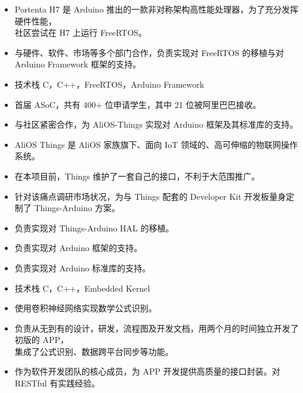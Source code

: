 \documentclass{resume}
\begin{document}
\begin{itemize}
  \item Portenta H7 是 Arduino 推出的一款非对称架构高性能处理器，为了充分发挥硬件性能，\\社区尝试在 H7 上运行 FreeRTOS。
  \item 与硬件、软件、市场等多个部门合作，负责实现对 FreeRTOS 的移植与对 Arduino Framework 框架的支持。
  \item 技术栈 C，C++，FreeRTOS，Arduino Framework
\end{itemize}

\continue

\clearpage

\begin{itemize}
  \item 首届 ASoC，共有 400+ 位申请学生，其中 21 位被阿里巴巴接收。
  \item 与社区紧密合作，为 AliOS-Things 实现对 Arduino 框架及其标准库的支持。
  \item AliOS Things 是 AliOS 家族旗下、面向 IoT 领域的、高可伸缩的物联网操作系统。
  \item 在本项目前，Things 维护了一套自己的接口，不利于大范围推广。
  \item 针对该痛点调研市场状况，为与 Things 配套的 Developer Kit 开发板量身定制了 Things-Arduino 方案。
  \item 负责实现对 Things-Arduino HAL 的移植。
  \item 负责实现对 Arduino 框架的支持。
  \item 负责实现对 Arduino 标准库的支持。
  \item 技术栈 C，C++，Embedded Kernel
\end{itemize}

\begin{itemize}
  \item 使用卷积神经网络实现数学公式识别。
  \item 负责从无到有的设计，研发，流程图及开发文档，用两个月的时间独立开发了初版的 APP，\\集成了公式识别、数据跨平台同步等功能。
  \item 作为软件开发团队的核心成员，为 APP 开发提供高质量的接口封装。对 RESTful 有实践经验。
\end{itemize}
\end{document}
